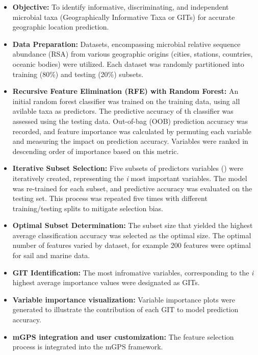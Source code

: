 \begin{itemize}
    \item \textbf{Objective:} To identify informative, discriminating, and independent microbial taxa (Geographically Informative Taxa or GITs) for accurate geographic location prediction.
    \item \textbf{Data Preparation:} Datasets, encompassing microbial relative sequence abundance (RSA) from various geographic origins (cities, stations, countries, oceanic bodies) were utilized.
    Each dataset was randomly partitioned into training (80\%) and testing (20\%) subsets.
    \item \textbf{Recursive Feature Elimination (RFE) with Random Forest:} An initial random forest classifier was trained on the training data, using all avilable taxa as predictors.
    The predictive accuracy of th classifier was assessed using the testing data. Out-of-bag (OOB) prediction accuracy was recorded, and feature importance was calculated by permuting each variable and measuring the impact on prediction accuracy.
    Variables were ranked in descending order of importance based on this metric.
    \item \textbf{Iterative Subset Selection:} Five subsets of predictors variables () were iteratively created, representing the \textit{i} most important variables. The model
    was re-trained for each subset, and predictive accuracy was evaluated on the testing set. This process was repeated five times with different training/testing splits to mitigate selection bias.
    \item \textbf{Optimal Subset Determination:} The subset size that yielded the highest average classification accuracy was selected as the optimal size. The optimal number of features varied by dataset, for example
    200 features were optimal for sail and marine data.
    \item \textbf{GIT Identification:} The most infromative variables, corresponding to the \textit{i} highest average importance values were designated as GITs.
    \item  \textbf{Variable importance visualization:} Variable importance plots were generated to illustrate the contribution of each GIT to model prediction accuracy.
    \item \textbf{mGPS integration and user customization:} The feature selection process is integrated into the mGPS framework. 
\end{itemize}
